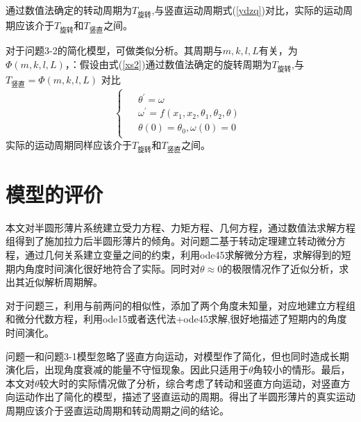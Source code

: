 \documentclass[withoutpreface,bwprint]{cumcmthesis} %
\begin{document}
\noindent 通过数值法确定的转动周期为$	T_{\text{旋转}}$,与竖直运动周期式(\ref{ydzq})对比，实际的运动周期应该介于$T_{\text{旋转}}$和$T_{\text{竖直}}$之间。

对于问题3-2的简化模型，可做类似分析。其周期与$m,k,l,L$有关，为$\Phi(m,k,l,L)$，：假设由式(\ref{xs2})通过数值法确定的旋转周期为$	T_{\text{旋转}}$,与$T_{\text{竖直}}=\Phi(m,k,l,L)$ 对比
	\begin{equation}\label{xs2}
\left\{\begin{array}{l}
\begin{aligned}
&\theta^{\prime}=\omega \\
&\omega^{\prime}=f\left(x_{1}, x_{2}, \theta_{1}, \theta_{2}, \theta\right) \\
&\theta(0)=\theta_0,\omega(0)=0
\end{aligned}
\end{array}\right.
\end{equation}
实际的运动周期同样应该介于$T_{\text{旋转}}$和$T_{\text{竖直}}$之间。

	
	\section{模型的评价}
   本文对半圆形薄片系统建立受力方程、力矩方程、几何方程，通过数值法求解方程组得到了施加拉力后半圆形薄片的倾角。对问题二基于转动定理建立转动微分方程，通过几何关系建立变量之间的约束，利用ode45求解微分方程，求解得到的短期内角度时间演化很好地符合了实际。同时对$\theta \approx 0$的极限情况作了近似分析，求出其近似解析周期解。
   
   对于问题三，利用与前两问的相似性，添加了两个角度未知量，对应地建立方程组和微分代数方程，利用ode15或者迭代法+ode45求解,很好地描述了短期内的角度时间演化。
   
   问题一和问题3-1模型忽略了竖直方向运动，对模型作了简化，但也同时造成长期演化后，出现角度衰减的能量不守恒现象。因此只适用于$\theta$角较小的情形。最后，本文对$\theta$较大时的实际情况做了分析，综合考虑了转动和竖直方向运动，对竖直方向运动作出了简化的模型，描述了竖直运动的周期。得出了半圆形薄片的真实运动周期应该介于竖直运动周期和转动周期之间的结论。
   
\end{document}

